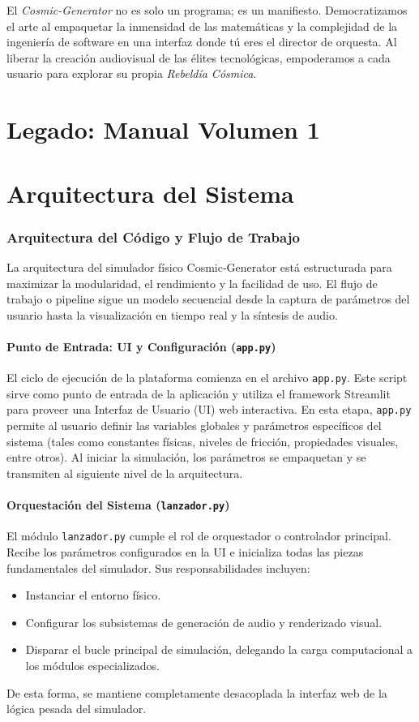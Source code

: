 \documentclass[12pt, openany]{book}
\begin{document}
El \textit{Cosmic-Generator} no es solo un programa; es un manifiesto. Democratizamos el arte al empaquetar la inmensidad de las matemáticas y la complejidad de la ingeniería de software en una interfaz donde tú eres el director de orquesta. Al liberar la creación audiovisual de las élites tecnológicas, empoderamos a cada usuario para explorar su propia \textit{Rebeldía Cósmica}.

\part{Legado: Manual Volumen 1}


\newpage
\part{Arquitectura del Sistema}

\section{Arquitectura del Código y Flujo de Trabajo}

La arquitectura del simulador físico Cosmic-Generator está estructurada para maximizar la modularidad, el rendimiento y la facilidad de uso. El flujo de trabajo o pipeline sigue un modelo secuencial desde la captura de parámetros del usuario hasta la visualización en tiempo real y la síntesis de audio.

\subsection{Punto de Entrada: UI y Configuración (\texttt{app.py})}
El ciclo de ejecución de la plataforma comienza en el archivo \texttt{app.py}. Este script sirve como punto de entrada de la aplicación y utiliza el framework Streamlit para proveer una Interfaz de Usuario (UI) web interactiva. En esta etapa, \texttt{app.py} permite al usuario definir las variables globales y parámetros específicos del sistema (tales como constantes físicas, niveles de fricción, propiedades visuales, entre otros). Al iniciar la simulación, los parámetros se empaquetan y se transmiten al siguiente nivel de la arquitectura.

\subsection{Orquestación del Sistema (\texttt{lanzador.py})}
El módulo \texttt{lanzador.py} cumple el rol de orquestador o controlador principal. Recibe los parámetros configurados en la UI e inicializa todas las piezas fundamentales del simulador. Sus responsabilidades incluyen:
\begin{itemize}
    \item Instanciar el entorno físico.
    \item Configurar los subsistemas de generación de audio y renderizado visual.
    \item Disparar el bucle principal de simulación, delegando la carga computacional a los módulos especializados.
\end{itemize}
De esta forma, se mantiene completamente desacoplada la interfaz web de la lógica pesada del simulador.
\end{document}
